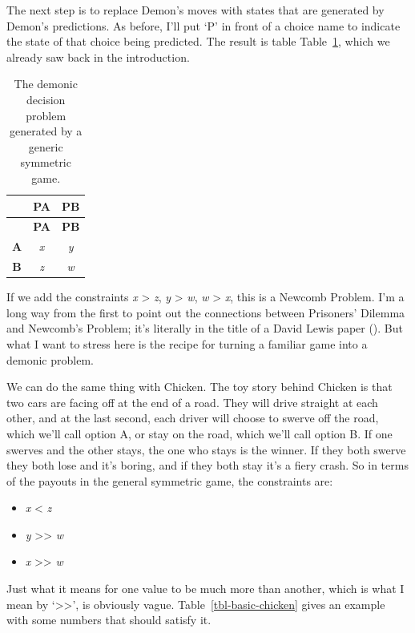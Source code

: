 \documentclass[
  12pt,
  letterpaper,
  DIV=11,
  numbers=noendperiod]{scrreprt}
\providecommand{\tightlist}{%
  \setlength{\itemsep}{0pt}\setlength{\parskip}{0pt}}\usepackage{longtable,booktabs,array}
\begin{document}
The next step is to replace Demon's moves with states that are generated
by Demon's predictions. As before, I'll put `P' in front of a choice
name to indicate the state of that choice being predicted. The result is
table Table~\ref{tbl-gen-dem-problem}, which we already saw back in the
introduction.

\begin{longtable}[]{@{}ccc@{}}
\caption{The demonic decision problem generated by a generic symmetric
game.}\label{tbl-gen-dem-problem}\tabularnewline
\toprule\noalign{}
& \textbf{PA} & \textbf{PB} \\
\midrule\noalign{}
\endfirsthead
\toprule\noalign{}
& \textbf{PA} & \textbf{PB} \\
\midrule\noalign{}
\endhead
\bottomrule\noalign{}
\endlastfoot
\textbf{A} & \emph{x} & \emph{y} \\
\textbf{B} & \emph{z} & \emph{w} \\
\end{longtable}

If we add the constraints \emph{x} \textgreater{} \emph{z}, \emph{y}
\textgreater{} \emph{w}, \emph{w} \textgreater{} \emph{x}, this is a
Newcomb Problem. I'm a long way from the first to point out the
connections between Prisoners' Dilemma and Newcomb's Problem; it's
literally in the title of a David Lewis paper
(). But what I want to stress here
is the recipe for turning a familiar game into a demonic problem.

We can do the same thing with Chicken. The toy story behind Chicken is
that two cars are facing off at the end of a road. They will drive
straight at each other, and at the last second, each driver will choose
to swerve off the road, which we'll call option A, or stay on the road,
which we'll call option B. If one swerves and the other stays, the one
who stays is the winner. If they both swerve they both lose and it's
boring, and if they both stay it's a fiery crash. So in terms of the
payouts in the general symmetric game, the constraints are:

\begin{itemize}
\tightlist
\item
  \emph{x} \textless{} \emph{z}
\item
  \emph{y} \textgreater\textgreater{} \emph{w}
\item
  \emph{x} \textgreater\textgreater{} \emph{w}
\end{itemize}

Just what it means for one value to be much more than another, which is
what I mean by `\textgreater\textgreater{}', is obviously vague.
Table~\ref{tbl-basic-chicken} gives an example with some numbers that
should satisfy it.
\end{document}
